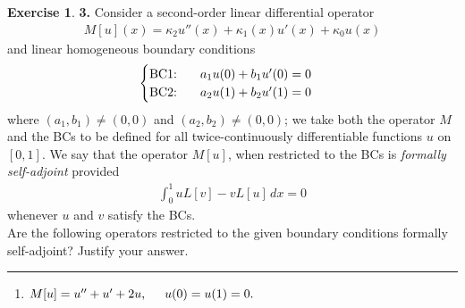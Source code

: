 \documentclass{article}
\theoremstyle{definition}
\newtheorem*{exer*}{Exercise}
\begin{document}
\newpage


\begin{exer*}\textbf{3. }
	Consider a second-order linear differential operator
	\begin{align*}
	M[u](x) = \kappa_2 u''(x) + \kappa_1(x)u'(x) + \kappa_0 u(x)
	\end{align*}
	and linear homogeneous boundary conditions 
	\begin{align*}
	\begin{cases}
	\text{BC1: }\hspace{0.5cm} a_1u(0) + b_1u'(0) = 0\\
	\text{BC2: }\hspace{0.5cm} a_2u(1) + b_2 u'(1) = 0
	\end{cases}
	\end{align*}
	where $(a_1,b_1) \neq (0,0)$ and $(a_2,b_2) \neq (0,0)$; we take both the operator $M$ and the BCs to be defined for all twice-continuously differentiable functions $u$ on $[0,1]$. We say that the operator $M[u]$, when restricted to the BCs is \textit{formally self-adjoint} provided
	\begin{align*}
	\int^1_0 uL[v] - vL[u]\,dx = 0
	\end{align*}
	whenever $u$ and $v$ satisfy the BCs. \\
	
	Are the following operators restricted to the given boundary conditions formally self-adjoint? Justify your
	answer.
	
	
	\noindent\rule{\textwidth}{0.5pt}
	
	\begin{enumerate}
		\item $M[u] = u''+ u' + 2u,\hspace{0.5cm} u(0) = u(1) = 0.$\\
		

\end{enumerate}
\end{exer*}
\end{document}
